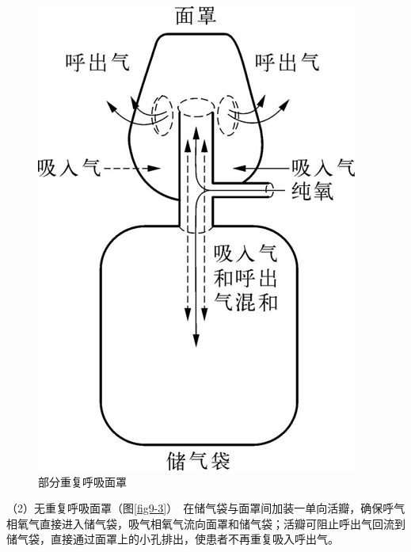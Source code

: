 \begin{figure}[!htbp]
 \centering
 \includegraphics{./images/Image00072.jpg}
 \captionsetup{justification=centering}
 \caption{部分重复呼吸面罩}
 \label{fig9-2}
  \end{figure} 

（2）无重复呼吸面罩（图\ref{fig9-3}）　在储气袋与面罩间加装一单向活瓣，确保呼气相氧气直接进入储气袋，吸气相氧气流向面罩和储气袋；活瓣可阻止呼出气回流到储气袋，直接通过面罩上的小孔排出，使患者不再重复吸入呼出气。

